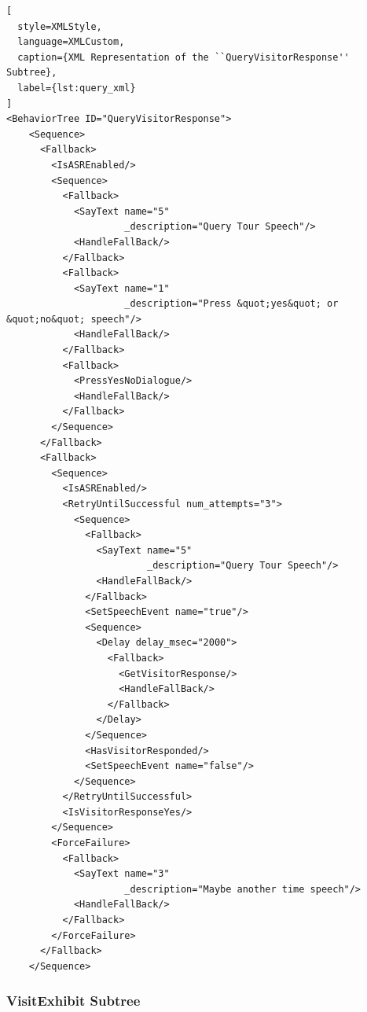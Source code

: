 \documentclass{CSSRforAfrica}
\begin{document}
\begin{lstlisting}[
  style=XMLStyle, 
  language=XMLCustom, 
  caption={XML Representation of the ``QueryVisitorResponse'' Subtree},
  label={lst:query_xml}
]
<BehaviorTree ID="QueryVisitorResponse">
    <Sequence>
      <Fallback>
        <IsASREnabled/>
        <Sequence>
          <Fallback>
            <SayText name="5"
                     _description="Query Tour Speech"/>
            <HandleFallBack/>
          </Fallback>
          <Fallback>
            <SayText name="1"
                     _description="Press &quot;yes&quot; or &quot;no&quot; speech"/>
            <HandleFallBack/>
          </Fallback>
          <Fallback>
            <PressYesNoDialogue/>
            <HandleFallBack/>
          </Fallback>
        </Sequence>
      </Fallback>
      <Fallback>
        <Sequence>
          <IsASREnabled/>
          <RetryUntilSuccessful num_attempts="3">
            <Sequence>
              <Fallback>
                <SayText name="5"
                         _description="Query Tour Speech"/>
                <HandleFallBack/>
              </Fallback>
              <SetSpeechEvent name="true"/>
              <Sequence>
                <Delay delay_msec="2000">
                  <Fallback>
                    <GetVisitorResponse/>
                    <HandleFallBack/>
                  </Fallback>
                </Delay>
              </Sequence>
              <HasVisitorResponded/>
              <SetSpeechEvent name="false"/>
            </Sequence>
          </RetryUntilSuccessful>
          <IsVisitorResponseYes/>
        </Sequence>
        <ForceFailure>
          <Fallback>
            <SayText name="3"
                     _description="Maybe another time speech"/>
            <HandleFallBack/>
          </Fallback>
        </ForceFailure>
      </Fallback>
    </Sequence>
\end{lstlisting}

 
\newpage

\subsubsection{VisitExhibit Subtree}
 
\end{document}
